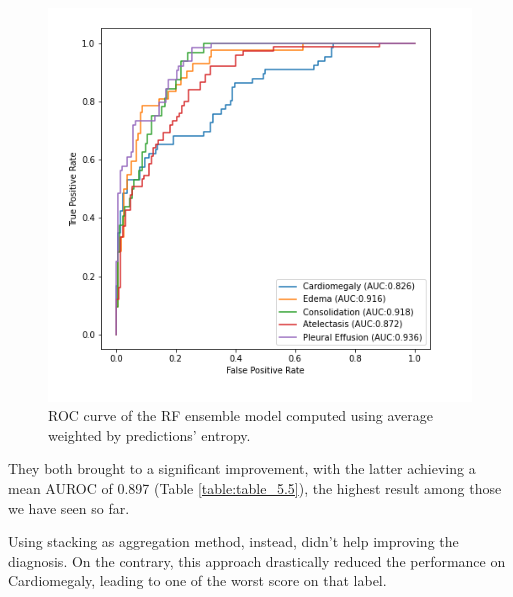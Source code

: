 \begin{figure}[htbp!]
    \centering
    \includegraphics[scale=0.55]{Tesi/images/Results/rf_average_entropy.png}
    \caption[ROC curve for RF weighted average ensemble]{ROC curve of the RF ensemble model computed using average weighted by predictions' entropy.}
    \label{fig:figure_5.9}
\end{figure}

\noindent They both brought to a significant improvement, with the latter achieving a mean AUROC of 0.897 (Table \ref{table:table_5.5}), the highest result among those we have seen so far. 

\noindent Using stacking as aggregation method, instead, didn't help improving the diagnosis. On the contrary, this approach drastically reduced the performance on Cardiomegaly, leading to one of the worst score on that label. 

